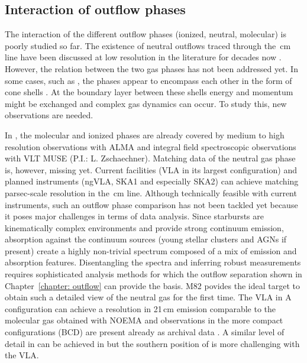 
\subsection{Interaction of outflow phases}

The interaction of the different outflow phases (ionized, neutral, molecular) is poorly studied so far. 
The existence of neutral outflows traced through the \,cm line have been discussed at low resolution in the literature for decades now \citep[e.g. M82 and NGC253][]{Boomsma:2005fa,Lucero:2015if}.
However, the relation between the two gas phases has not been addressed yet.
In some cases, such as , the phases appear to encompass each other in the form of cone shells \citep[see Figure~\ref{introduction: figure: star formation: outflow cone},][]{2015ApJ...801...63M}. At the boundary layer between these shells energy and momentum might be exchanged and complex gas dynamics can occur.
To study this, new observations are needed. 

In , the molecular and ionized phases are already covered by medium to high resolution observations with ALMA and integral field spectroscopic observations with VLT MUSE (P.I.: L. Zschaechner). Matching data of the neutral gas phase is, however, missing yet. 
Current facilities (VLA in its largest configuration) and planned instruments (ngVLA, SKA1 and especially SKA2) can achieve matching parsec-scale resolution in the \,cm line.
Although technically feasible with current instruments, such an outflow phase comparison has not been tackled yet because it poses major challenges in terms of data analysis.
Since starbursts are kinematically complex environments and provide strong continuum emission, absorption against the continuum sources (young stellar clusters and AGNs if present) create a highly non-trivial spectrum composed of a mix of emission and absorption features. Disentangling the spectra and inferring robust measurements requires sophisticated analysis methods for which the outflow separation shown in Chapter~\ref{chapter: outflow} can provide the basis.
M82 povides the ideal target to obtain such a detailed view of the neutral gas for the first time.
The VLA in A configuration can achieve a resolution in 21\,cm \hi emission comparable to the molecular gas obtained with NOEMA and observations in the more compact configurations (BCD) are present already as archival data \citep{2015ApJ...814...83L,2018ApJ...856...61M}.
A similar level of detail in \hi can be achieved in  but the southern position of  is more challenging with the VLA.



